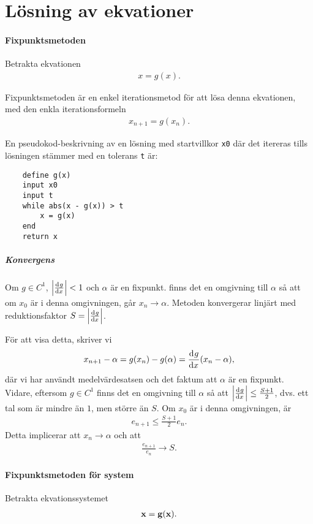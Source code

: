 \section{Lösning av ekvationer}

\paragraph{Fixpunktsmetoden}
Betrakta ekvationen
\begin{align*}
	x = g(x).
\end{align*}

Fixpunktsmetoden är en enkel iterationsmetod för att lösa denna ekvationen, med den enkla iterationsformeln
\begin{align*}
	x_{n + 1} = g(x_{n}).
\end{align*}

En pseudokod-beskrivning av en lösning med startvillkor \verb|x0| där det itereras tills lösningen stämmer med en tolerans \verb|t| är:
\begin{lstlisting}
	define g(x)
	input x0
	input t
	while abs(x - g(x)) > t
		x = g(x)
	end
	return x
\end{lstlisting}

\subparagraph{Konvergens}
Om $g\in C^{1}$, $\abs{\dv[]{g}{x} (\alpha)} < 1$ och $\alpha$ är en fixpunkt. finns det en omgivning till $\alpha$ så att om $x_{0}$ är i denna omgivningen, går $x_{n}\to\alpha$. Metoden konvergerar linjärt med reduktionsfaktor $S = \abs{\dv[]{g}{x} (\alpha)}$.

För att visa detta, skriver vi
\begin{align*}
	x_{n + 1} - \alpha = g(x_{n}) - g(\alpha) = \dv[]{g}{x} (c)(x_{n} - \alpha),
\end{align*}
där vi har användt medelvärdesatsen och det faktum att $\alpha$ är en fixpunkt. Vidare, eftersom $g\in C^{1}$ finns det en omgivning till $\alpha$ så att $\abs{\dv[]{g}{x} (x)}\leq \frac{S + 1}{2}$, dvs. ett tal som är mindre än $1$, men större än $S$. Om $x_{0}$ är i denna omgivningen, är 
\begin{align*}
	e_{n + 1} \leq \frac{S + 1}{2}e_{n}.
\end{align*}
Detta implicerar att $x_{n} \to \alpha$ och att
\begin{align*}
	\frac{e_{n + 1}}{e_{n}} \to S.
\end{align*}

\paragraph{Fixpunktsmetoden för system}
Betrakta ekvationssystemet
\begin{align*}
	\vb{x} = \vb{g}(\vb{x}).
\end{align*}

